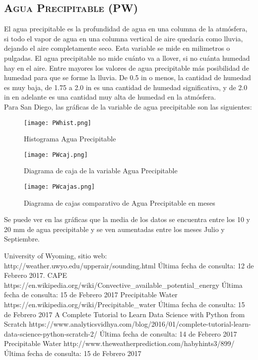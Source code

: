 \documentclass[12pt]{article}
\begin{document}

\subsection{\textsc{Agua Precipitable (PW)}}
El agua precipitable es la profundidad de agua en una columna de la atmósfera, si todo el vapor de agua en una columna vertical de aire quedaría como lluvia, dejando el aire completamente seco. Esta variable se mide en milimetros o pulgadas. El agua precipitable no mide cuánto va a llover, si no cuánta humedad hay en el aire. Entre mayores los valores de agua precipitable más posibilidad de humedad para que se forme la lluvia. De 0.5 in o menos, la cantidad de humedad es muy baja, de 1.75 a 2.0 in es una cantidad de humedad significativa, y de 2.0 in en adelante es una cantidad muy alta de humedad en la atmósfera. \\

Para San Diego, las gráficas de la variable de agua precipitable son las siguientes:

\begin{figure}[h]
\centering
\texttt{[image: PWhist.png]}
\caption{Histograma Agua Precipitable}
\end{figure}

\begin{figure}[h]
\centering
\texttt{[image: PWcaj.png]}
\caption{Diagrama de caja de la variable Agua Precipitable}
\end{figure}

\begin{figure}[!ht]
\centering
\texttt{[image: PWcajas.png]}
\caption{Diagrama de cajas comparativo de Agua Precipitable en meses}
\end{figure}

Se puede ver en las gráficas que la media de los datos se encuentra entre los 10 y 20 mm de agua precipitable y se ven aumentadas entre los meses Julio y Septiembre.

\pagebreak
\begin{thebibliography}{9}
University of Wyoming, sitio web: http://weather.uwyo.edu/upperair/sounding.html Última fecha de consulta: 12 de Febrero 2017.
CAPE https://en.wikipedia.org/wiki/Convective\_available\_potential\_energy Última fecha de consulta: 15 de Febrero 2017
Precipitable Water https://en.wikipedia.org/wiki/Precipitable\_water Última fecha de consulta: 15 de Febrero 2017
A Complete Tutorial to Learn Data Science with Python from Scratch https://www.analyticsvidhya.com/blog/2016/01/complete-tutorial-learn-data-science-python-scratch-2/ Última fecha de consulta: 14 de Febrero 2017
Precipitable Water http://www.theweatherprediction.com/habyhints3/899/ Última fecha de consulta: 15 de Febrero 2017
\end{thebibliography}
\end{document}
